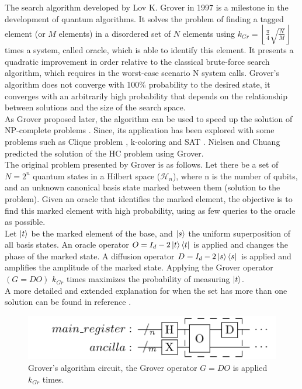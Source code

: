 \documentclass[10pt,a4paper]{article}
\begin{document}
The search algorithm developed by Lov K. Grover in 1997 \cite{Grover1} is a milestone in the development of quantum algorithms. It solves the problem of finding a tagged element (or $M$ elements) in a disordered set of $N$ elements using $k_{Gr}= \left\lfloor\frac{\pi}{4} \sqrt{\frac{N}{M}}\right\rfloor$ times a system, called oracle, which is able to identify this element. It presents a quadratic improvement in order relative to the classical brute-force search algorithm, which requires in the worst-case scenario N system calls. Grover's algorithm does not converge with 100\% probability to the desired state, it converges with an arbitrarily high probability that depends on the relationship between solutions and the size of the search space.\\
As Grover proposed later, the algorithm can be used to speed up the solution of NP-complete problems \cite{Grover2}. Since, its application has been explored with some problems such as Clique problem \cite{Clique, Clique2}, k-coloring \cite{Coloring1, Coloring2} and SAT \cite{SAT_ions, SAT_paralel}. Nielsen and Chuang predicted the solution of the HC problem using Grover\cite{Nielsen_Chuang_2010}.\\
The original problem presented by Grover \cite{Grover1} is as follows. Let there be a set of $N = 2^n$ quantum states in a Hilbert space ($\mathcal{H}_n$), where n is the number of qubits, and an unknown canonical basis state marked between them (solution to the problem). Given an oracle that identifies the marked element, the objective is to find this marked element with high probability, using as few queries to the oracle as possible.\\
Let $\ket{t}$ be the marked element of the base, and $\ket{s}$ the uniform superposition of all basis states. An oracle operator $O = I_d - 2\ket{t}\bra{t}$ is applied and changes the phase of the marked state. A diffusion operator $D = I_d - 2\ket{s}\bra{s}$ is applied and amplifies the amplitude of the marked state. Applying the Grover operator $(G=DO)$ $k_{Gr}$ times maximizes the probability of measuring $\ket{t}$.\\
A more detailed and extended explanation for when the set has more than one solution can be found in reference \cite{Nielsen_Chuang_2010}.

\begin{figure}[hbtp]
\centering
\includegraphics[scale=1.5]{figures/grover.pdf}
\caption{Grover's algorithm circuit, the Grover operator $G = DO$ is applied $k_{Gr}$ times.}
\end{figure}
\end{document}

